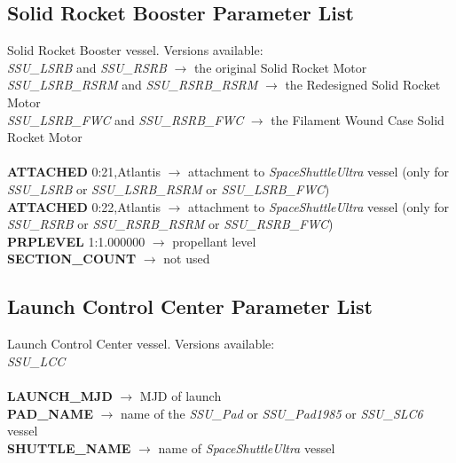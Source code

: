 \documentclass[Space_Shuttle_Ultra_Manual.tex]{subfiles}
\begin{document}
\begin{multicols*}{2}
\subsection{Solid Rocket Booster Parameter List}
\noindent
Solid Rocket Booster vessel. Versions available:
\\
\textit{SSU\_LSRB} and \textit{SSU\_RSRB} $\rightarrow$ the original Solid Rocket Motor
\\
\textit{SSU\_LSRB\_RSRM} and \textit{SSU\_RSRB\_RSRM} $\rightarrow$ the Redesigned Solid Rocket Motor
\\
\textit{SSU\_LSRB\_FWC} and \textit{SSU\_RSRB\_FWC} $\rightarrow$ the Filament Wound Case Solid Rocket Motor
\\
\\
\textbf{ATTACHED} 0:21,Atlantis $\rightarrow$ attachment to \textit{SpaceShuttleUltra} vessel (only for \textit{SSU\_LSRB} or \textit{SSU\_LSRB\_RSRM} or \textit{SSU\_LSRB\_FWC})
\\
\textbf{ATTACHED} 0:22,Atlantis $\rightarrow$ attachment to \textit{SpaceShuttleUltra} vessel (only for \textit{SSU\_RSRB} or \textit{SSU\_RSRB\_RSRM} or \textit{SSU\_RSRB\_FWC})
\\
\textbf{PRPLEVEL} 1:1.000000 $\rightarrow$ propellant level
\\
\textbf{SECTION\_COUNT} $\rightarrow$ not used
\\

\subsection{Launch Control Center Parameter List}
\noindent
Launch Control Center vessel. Versions available:
\\
\textit{SSU\_LCC}
\\
\\
\textbf{LAUNCH\_MJD} $\rightarrow$ MJD of launch
\\
\textbf{PAD\_NAME} $\rightarrow$ name of the \textit{SSU\_Pad} or \textit{SSU\_Pad1985} or \textit{SSU\_SLC6} vessel
\\
\textbf{SHUTTLE\_NAME} $\rightarrow$ name of \textit{SpaceShuttleUltra} vessel
\\


\end{multicols*}
\end{document}
